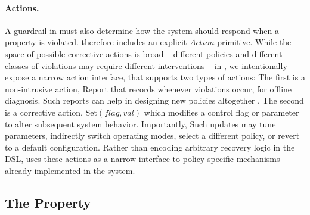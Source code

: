 \paragraph{Actions.} 
A guardrail in \lang must also determine how the system should respond when a property is violated. \lang therefore includes an explicit $Action$ primitive.
While the space of possible corrective actions is broad -- different policies and different classes of violations may require different interventions -- in \lang, we intentionally expose a narrow action interface, that supports two types of actions:
The first is a non-intrusive action, {\sf Report} that records whenever violations occur, for offline diagnosis. Such reports can help in designing new policies altogether .
The second is a corrective action, {\sf Set}$(flag, val)$ which modifies a control flag or parameter to alter subsequent system behavior.
Importantly, 
Such updates may tune parameters, indirectly switch operating modes, select a different policy, or revert to a default configuration.
Rather than encoding arbitrary recovery logic in the DSL, \lang uses these actions as a narrow interface to policy-specific mechanisms already implemented in the system. 


\subsection{The \noregression Property}\label{subsec:formal-basis}

